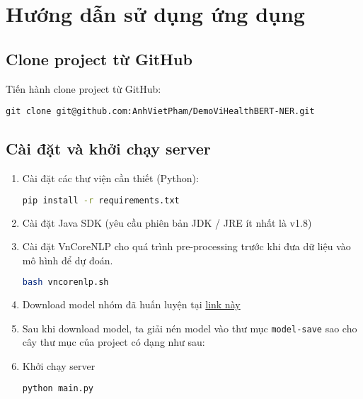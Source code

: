 \section{Hướng dẫn sử dụng ứng dụng}
\subsection{Clone project từ GitHub}
Tiến hành clone project từ GitHub:
\begin{lstlisting}
git clone git@github.com:AnhVietPham/DemoViHealthBERT-NER.git
\end{lstlisting}

\subsection{Cài đặt và khởi chạy server}
\begin{enumerate}
\item Cài đặt các thư viện cần thiết (Python):
\lstset{style=mystyle}
\begin{lstlisting}[language=bash]
pip install -r requirements.txt
\end{lstlisting}

\item Cài đặt Java SDK (yêu cầu phiên bản JDK / JRE ít nhất là v1.8)

\item Cài đặt VnCoreNLP cho quá trình pre-processing trước khi đưa dữ liệu vào mô hình để dự đoán.

\lstset{style=mystyle}
\begin{lstlisting}[language=bash]
bash vncorenlp.sh
\end{lstlisting}

\item Download model nhóm đã huấn luyện tại  \href{https://drive.google.com/drive/u/2/folders/19AGLo-27EeuXDkKG2JstuCgrcwB0854r}{link này}

\item Sau khi download model, ta giải nén model vào thư mục \texttt{model-save} sao cho cây thư mục của project có dạng như sau:


\item Khởi chạy server
\lstset{style=mystyle}
\begin{lstlisting}[language=bash]
python main.py 
\end{lstlisting}
\end{enumerate}
